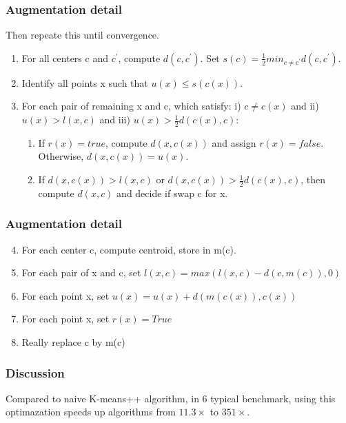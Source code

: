 \documentclass[9pt]{beamer}
\newcommand{\ccp}[1]{{\color{purple}#1}}
\begin{document}
\begin{frame}
	\frametitle{Augmentation detail}

Then repeate this until convergence.
\begin{enumerate}
\item For all centers c and $c^{\prime}$, compute $d(c, c^{\prime})$. Set $s(c) = \frac{1}{2}min_{c \ne c^{\prime}}d(c,c^{\prime})$.
\item \ccp{Identify all points x such that $u(x) \le s(c(x))$. }
\item For each pair of remaining x and c, which satisfy: i) $c \ne c(x)$ and ii) $u(x) > l(x,c)$ and \ccp{iii) $u(x) > \frac{1}{2}d(c(x), c)$}: 
\begin{enumerate}
\item If $r(x) = true$, compute $d(x,c(x))$ and assign $r(x)=false$. \ccp{Otherwise, $d(x,c(x)) = u(x).$ }
\item \ccp{If $d(x,c(x))> l(x,c)$ or $d(x,c(x)) > \frac{1}{2}d(c(x), c)$}, then compute $d(x,c)$ and decide if swap c for x. 
\end{enumerate}

\end{enumerate}
\end{frame}

\begin{frame}
	\frametitle{Augmentation detail}
\begin{enumerate}
\setcounter{enumi}{3} 
\item For each center c, compute centroid, store in m(c).
\item For each  pair of x and c, set $l(x,c) = max(l(x,c) - d(c,m(c)), 0)$
\item For each point x, set $u(x) = u(x) + d(m(c(x)), c(x))$
\item For each point x, set $r(x) = True$
\item Really replace c by m(c)
\end{enumerate}
\end{frame}

\begin{frame}
	\frametitle{Discussion}
Compared to naive K-means++ algorithm, in 6 typical benchmark, using this optimazation speeds up algorithms from $ 11.3 \times$ to $  351 \times$.
\end{frame}
\end{document}
